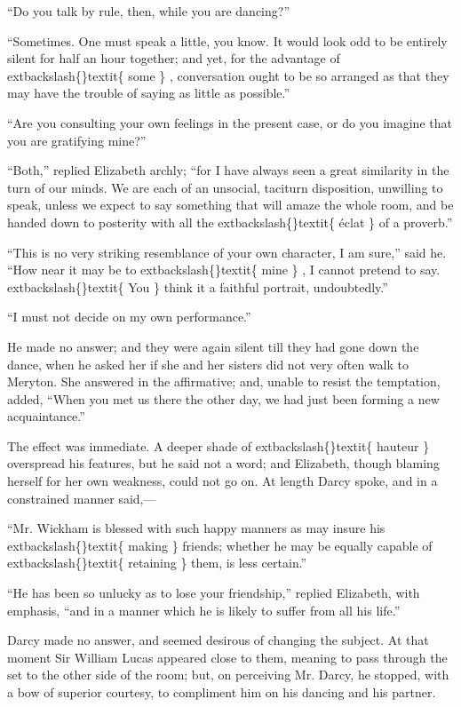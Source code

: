 \documentclass[10pt]{book}
\begin{document}
   “Do you talk by rule, then, while you are dancing?”
  

   “Sometimes. One must speak a little, you know. It would look odd to be
entirely silent for half an hour together; and yet, for the advantage of
   	extbackslash\{\}textit\{
    some
   \}
   , conversation ought to be so arranged as that they may have the
trouble of saying as little as possible.”
  

   “Are you consulting your own feelings in the present case, or do you
imagine that you are gratifying mine?”
  

   “Both,” replied Elizabeth archly; “for I have always seen a great
similarity in the turn of our minds. We are each of an unsocial,
taciturn disposition, unwilling to speak, unless we expect to say
something that will amaze the whole room, and be handed down to
posterity with all the
   	extbackslash\{\}textit\{
    éclat
   \}
   of a proverb.”
  

   “This is no very striking resemblance of your own character, I am sure,”
said he. “How near it may be to
   	extbackslash\{\}textit\{
    mine
   \}
   , I cannot pretend to say.
   	extbackslash\{\}textit\{
    You
   \}
   think it a faithful portrait, undoubtedly.”
  

   “I must not decide on my own performance.”
  

   He made no answer; and they were again silent till they had gone down
the dance, when he asked her if she
   and her sisters did not very often
walk to Meryton. She answered in the affirmative; and, unable to resist
the temptation, added, “When you met us there the other day, we had just
been forming a new acquaintance.”
  

   The effect was immediate. A deeper shade of
   	extbackslash\{\}textit\{
    hauteur
   \}
   overspread his
features, but he said not a word; and Elizabeth, though blaming herself
for her own weakness, could not go on. At length Darcy spoke, and in a
constrained manner said,—
  

   “Mr. Wickham is blessed with such happy manners as may insure his
   	extbackslash\{\}textit\{
    making
   \}
   friends; whether he may be equally capable of
   	extbackslash\{\}textit\{
    retaining
   \}
   them,
is less certain.”
  

   “He has been so unlucky as to lose your friendship,” replied Elizabeth,
with emphasis, “and in a manner which he is likely to suffer from all
his life.”
  

   Darcy made no answer, and seemed desirous of changing the subject. At
that moment Sir William Lucas appeared close to them, meaning to pass
through the set to the other side of the room; but, on perceiving Mr.
Darcy, he stopped, with a bow of superior courtesy, to compliment him on
his dancing and his partner.
  
\end{document}
